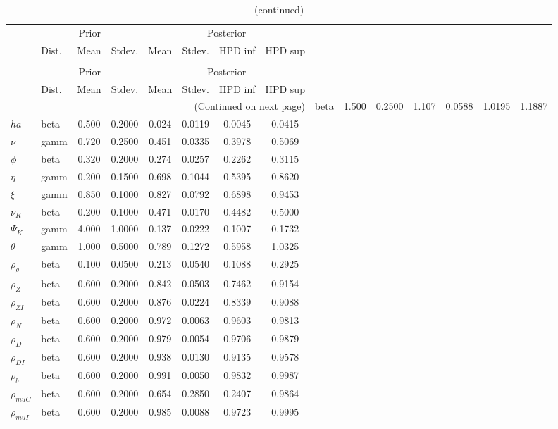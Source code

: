  
\begin{center}
\begin{longtable}{llcccccc} 
\caption{Results from Metropolis-Hastings (parameters)}
 \label{Table:MHPosterior:1}\\
\toprule 
  & \multicolumn{3}{c}{Prior}  &  \multicolumn{4}{c}{Posterior} \\
  \cmidrule(r{.75em}){2-4} \cmidrule(r{.75em}){5-8}
  & Dist. & Mean  & Stdev. & Mean & Stdev. & HPD inf & HPD sup\\
\midrule \endfirsthead 
\caption{(continued)}\\\toprule 
  & \multicolumn{3}{c}{Prior}  &  \multicolumn{4}{c}{Posterior} \\
  \cmidrule(r{.75em}){2-4} \cmidrule(r{.75em}){5-8}
  & Dist. & Mean  & Stdev. & Mean & Stdev. & HPD inf & HPD sup\\
\midrule \endhead 
\bottomrule \multicolumn{8}{r}{(Continued on next page)} \endfoot 
\bottomrule \endlastfoot 
${\sigma}$ & beta &   1.500 & 0.2500 &   1.107& 0.0588 &  1.0195 &  1.1887 \\ 
${ha}$ & beta &   0.500 & 0.2000 &   0.024& 0.0119 &  0.0045 &  0.0415 \\ 
$\nu$ & gamm &   0.720 & 0.2500 &   0.451& 0.0335 &  0.3978 &  0.5069 \\ 
${\phi}$ & beta &   0.320 & 0.2000 &   0.274& 0.0257 &  0.2262 &  0.3115 \\ 
${\eta}$ & gamm &   0.200 & 0.1500 &   0.698& 0.1044 &  0.5395 &  0.8620 \\ 
$\xi$ & gamm &   0.850 & 0.1000 &   0.827& 0.0792 &  0.6898 &  0.9453 \\ 
${\nu_R}$ & beta &   0.200 & 0.1000 &   0.471& 0.0170 &  0.4482 &  0.5000 \\ 
${\Psi_{K}}$ & gamm &   4.000 & 1.0000 &   0.137& 0.0222 &  0.1007 &  0.1732 \\ 
${\theta}$ & gamm &   1.000 & 0.5000 &   0.789& 0.1272 &  0.5958 &  1.0325 \\ 
${\rho_g}$ & beta &   0.100 & 0.0500 &   0.213& 0.0540 &  0.1088 &  0.2925 \\ 
${\rho_Z}$ & beta &   0.600 & 0.2000 &   0.842& 0.0503 &  0.7462 &  0.9154 \\ 
${\rho_{ZI}}$ & beta &   0.600 & 0.2000 &   0.876& 0.0224 &  0.8339 &  0.9088 \\ 
${\rho_N}$ & beta &   0.600 & 0.2000 &   0.972& 0.0063 &  0.9603 &  0.9813 \\ 
${\rho_D}$ & beta &   0.600 & 0.2000 &   0.979& 0.0054 &  0.9706 &  0.9879 \\ 
${\rho_{DI}}$ & beta &   0.600 & 0.2000 &   0.938& 0.0130 &  0.9135 &  0.9578 \\ 
${\rho_b}$ & beta &   0.600 & 0.2000 &   0.991& 0.0050 &  0.9832 &  0.9987 \\ 
${\rho_{muC}}$ & beta &   0.600 & 0.2000 &   0.654& 0.2850 &  0.2407 &  0.9864 \\ 
${\rho_{muI}}$ & beta &   0.600 & 0.2000 &   0.985& 0.0088 &  0.9723 &  0.9995 \\ 
\end{longtable}
 \end{center}
